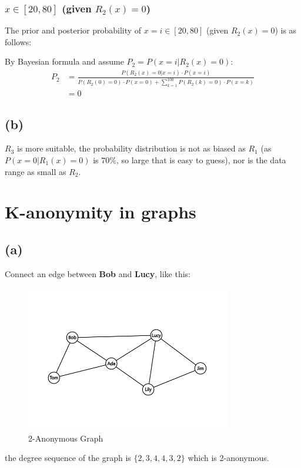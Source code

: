 \documentclass[a4paper,12pt]{article}
\begin{document}
\subsubsection{$x\in [20, 80]$ (given $R_2(x) = 0$)}
The prior and posterior probability of $x = i \in [20, 80]$ (given $R_2(x) = 0$) is as follows:

By Bayesian formula and assume $P_2 = P(x = i | R_2(x) = 0)$:
\begin{equation}
    \begin{aligned}
        P_2 & = \frac{P(R_2(x) = 0 | x = i)\cdot P(x = i)}{P(R_2(0) = 0)\cdot P(x = 0) + \sum\limits_{k = 1}^{100}P(R_2(k) = 0)\cdot P(x = k)} \\
            & = 0
    \end{aligned}
\end{equation}

\subsection{(b)}
$R_3$ is more suitable, the probability distribution is not as biased as $R_1$ (as $P(x = 0 | R_1(x) = 0)$ is $70\%$, so large that is easy to guess), nor is the data range as small as $R_2$.
\newpage
\section{K-anonymity in graphs}
\subsection{(a)}
Connect an edge between \textbf{Bob} and \textbf{Lucy}, like this:
\begin{figure}[ht]
    \centering
    \includegraphics[width=0.8\textwidth]{assets/1.png}
    \caption{2-Anonymous Graph}
\end{figure}
the degree sequence of the graph is $\{2, 3, 4, 4, 3, 2\}$ which is 2-anonymous.
\end{document}
